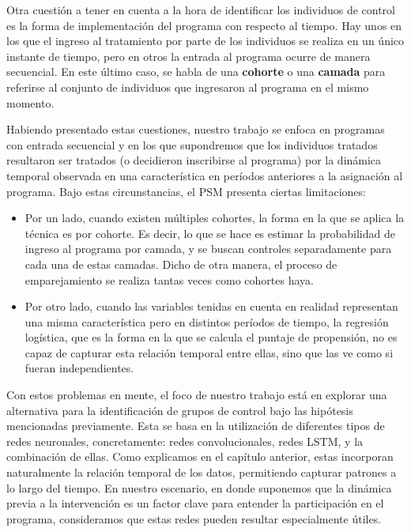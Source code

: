 \documentclass[../main.tex]{subfiles}
\begin{document}
Otra cuestión a tener en cuenta a la hora de identificar los individuos de control es la
forma de implementación del programa con respecto al tiempo. Hay unos en los que el
ingreso al tratamiento por parte de los individuos se realiza en un único instante de
tiempo, pero en otros la entrada al programa ocurre de manera secuencial. En este último
caso, se habla de una \textbf{cohorte} o una \textbf{camada} para referirse al conjunto de
individuos que ingresaron al programa en el mismo momento.

Habiendo presentado estas cuestiones, nuestro trabajo se enfoca en programas con entrada
secuencial y en los que supondremos que los individuos tratados resultaron ser tratados (o
decidieron inscribirse al programa) por la dinámica temporal observada en una
característica en períodos anteriores a la asignación al programa. Bajo estas
circunstancias, el PSM presenta ciertas limitaciones:
\begin{itemize}
    \item Por un lado, cuando existen múltiples cohortes, la forma en la que se aplica la
    técnica es por cohorte. Es decir, lo que se hace es estimar la probabilidad de ingreso
    al programa por camada, y se buscan controles separadamente para cada una de estas
    camadas. Dicho de otra manera, el proceso de emparejamiento se realiza tantas veces
    como cohortes haya.
    \item Por otro lado, cuando las variables tenidas en cuenta en realidad representan
    una misma característica pero en distintos períodos de tiempo, la regresión logística,
    que es la forma en la que se calcula el puntaje de propensión, no es capaz de capturar
    esta relación temporal entre ellas, sino que las ve como si fueran independientes.
\end{itemize}

Con estos problemas en mente, el foco de nuestro trabajo está en explorar una alternativa
para la identificación de grupos de control bajo las hipótesis mencionadas previamente.
Esta se basa en la utilización de diferentes tipos de redes neuronales, concretamente:
redes convolucionales, redes LSTM, y la combinación de ellas. Como explicamos en el
capítulo anterior, estas incorporan naturalmente la relación temporal de los datos,
permitiendo capturar patrones a lo largo del tiempo. En nuestro escenario, en donde
suponemos que la dinámica previa a la intervención es un factor clave para entender la
participación en el programa, consideramos que estas redes pueden resultar especialmente
útiles.
\end{document}
